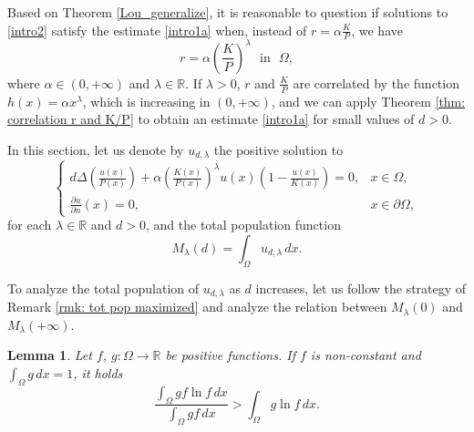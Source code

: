 \documentclass[11pt]{article}
\newcommand{\R}{\mathbb{R}}
\newcommand{\parentheses}[1]{\left(#1\right)}
\newtheorem{lemma}[statement]{Lemma}
\theoremstyle{definition}
\theoremstyle{remark}
\begin{document}
Based on Theorem \ref{Lou_generalize}, it is reasonable to question if solutions to \eqref{intro2} satisfy the estimate \eqref{intro1a} when, instead of $r=\alpha\frac{K}{P}$, we have
\begin{equation}\label{eq. r=(K/P)lambda}
    r=\alpha\parentheses{\frac{K}{P}}^\lambda~~~\textrm{in}~~~\Omega,
\end{equation}
where $\alpha\in(0,+\infty)$ and $\lambda\in\R$. If $\lambda>0$, $r$ and $\frac{K}{P}$ are correlated by the function $h(x)=\alpha x^\lambda$, which is increasing in $(0,+\infty)$, and we can apply Theorem \ref{thm: correlation r and K/P} to obtain an estimate \eqref{intro1a} for small values of $d>0$. 

In this section, let us denote by $u_{d,\lambda}$ the positive solution to
\begin{equation}\label{eq. prob r=(K/P)lambda}
    \begin{cases}
        d\Delta \parentheses{\frac{u(x)}{P(x)}} +\alpha\parentheses{\frac{K(x)}{P(x)}}^\lambda u (x) \parentheses{1-\frac{u(x)}{K(x)}}=0, &  x \in \Omega,\\
        \frac{\partial u}{\partial n}(x)=0 , &  x \in \partial\Omega,
    \end{cases} 
\end{equation}
for each $\lambda\in\R$ and $d>0$, and the total population function
\begin{equation*}
    M_\lambda(d)=\int_\Omega u_{d,\lambda}\,dx.
\end{equation*}

To analyze the total population of $u_{d,\lambda}$ as $d$ increases, let us follow the strategy of Remark \ref{rmk: tot pop maximized} and analyze the relation between $M_\lambda(0)$ and $M_\lambda(+\infty)$. 

\begin{lemma}
    Let $f$, $g:\Omega\to\R$ be positive functions. If $f$ is non-constant and $\int_\Omega g\,dx=1$, it holds
    \begin{equation}\label{Eq.2 M(infty) increasing}
        \frac{\int_\Omega gf\ln f\,dx}{\int_\Omega gf\,dx}>\int_\Omega g\ln f\,dx.
    \end{equation}
\end{lemma}
\end{document}
